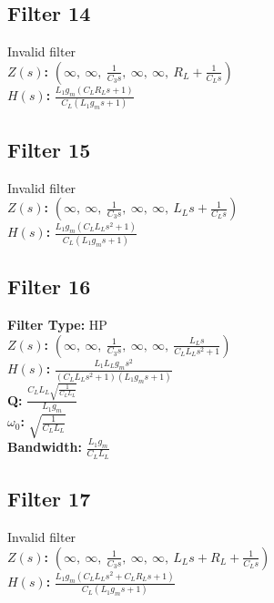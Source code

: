 \documentclass{article}
\begin{document}
\subsection*{Filter 14}
Invalid filter \\ 
\textbf{$Z(s)$:} $\left( \infty, \  \infty, \  \frac{1}{C_{3} s}, \  \infty, \  \infty, \  R_{L} + \frac{1}{C_{L} s}\right)$ \\ 
\textbf{$H(s)$:} $\frac{L_{1} g_{m} \left(C_{L} R_{L} s + 1\right)}{C_{L} \left(L_{1} g_{m} s + 1\right)}$ \\ 
\subsection*{Filter 15}
Invalid filter \\ 
\textbf{$Z(s)$:} $\left( \infty, \  \infty, \  \frac{1}{C_{3} s}, \  \infty, \  \infty, \  L_{L} s + \frac{1}{C_{L} s}\right)$ \\ 
\textbf{$H(s)$:} $\frac{L_{1} g_{m} \left(C_{L} L_{L} s^{2} + 1\right)}{C_{L} \left(L_{1} g_{m} s + 1\right)}$ \\ 
\subsection*{Filter 16}
\textbf{Filter Type:} HP \\ 
\textbf{$Z(s)$:} $\left( \infty, \  \infty, \  \frac{1}{C_{3} s}, \  \infty, \  \infty, \  \frac{L_{L} s}{C_{L} L_{L} s^{2} + 1}\right)$ \\ 
\textbf{$H(s)$:} $\frac{L_{1} L_{L} g_{m} s^{2}}{\left(C_{L} L_{L} s^{2} + 1\right) \left(L_{1} g_{m} s + 1\right)}$ \\ 
\textbf{Q:} $\frac{C_{L} L_{L} \sqrt{\frac{1}{C_{L} L_{L}}}}{L_{1} g_{m}}$ \\ 
\textbf{$\omega_0$:} $\sqrt{\frac{1}{C_{L} L_{L}}}$ \\ 
\textbf{Bandwidth:} $\frac{L_{1} g_{m}}{C_{L} L_{L}}$ \\ 
\subsection*{Filter 17}
Invalid filter \\ 
\textbf{$Z(s)$:} $\left( \infty, \  \infty, \  \frac{1}{C_{3} s}, \  \infty, \  \infty, \  L_{L} s + R_{L} + \frac{1}{C_{L} s}\right)$ \\ 
\textbf{$H(s)$:} $\frac{L_{1} g_{m} \left(C_{L} L_{L} s^{2} + C_{L} R_{L} s + 1\right)}{C_{L} \left(L_{1} g_{m} s + 1\right)}$ \\ 
\end{document}
